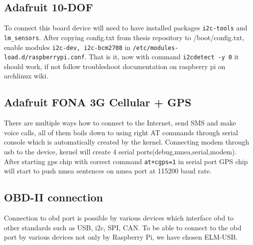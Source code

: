 \subsection{Adafruit 10-DOF} %
\label{sub:adafruit_10_dof}
To connect this board device will need to have installed packages \verb|i2c-tools| and \verb|lm_sensors|. After copying config.txt from thesis repository to /boot/config.txt, enable modules \verb|i2c-dev, i2c-bcm2708| in \verb|/etc/modules-load.d/raspberrypi.conf|. That is it, now with command \verb|i2cdetect -y 0| it should work, if not follow troubleshoot documentation on raspberry pi on archlinux wiki\cite{rpi_wiki}.
\subsection{Adafruit FONA 3G Cellular + GPS} %
\label{sub:adafruit_fona_3g_cellular_gps_}
There are multiple ways how to connect to the Internet, send SMS and make voice calls, all of them boils down to using right AT commands through serial console which is automatically created by the kernel. Connecting modem through usb to the device, kernel will create 4 serial ports(debug,nmea,serial,modem). After starting gps chip with correct command \verb|at+cgps=1| in serial port GPS chip will start to push nmea sentences on nmea port at 115200 baud rate.\cite{at_doc}
\subsection{OBD-II connection} %
\label{sub:obd_ii_connection}
Connection to \gls{obd} port is possible by various devices which interface \gls{obd} to other standards such as USB, \gls{i2c}, SPI, CAN. To be able to connect to the \gls{obd} port by various devices not only by Raspberry Pi, we have chosen ELM-USB.
